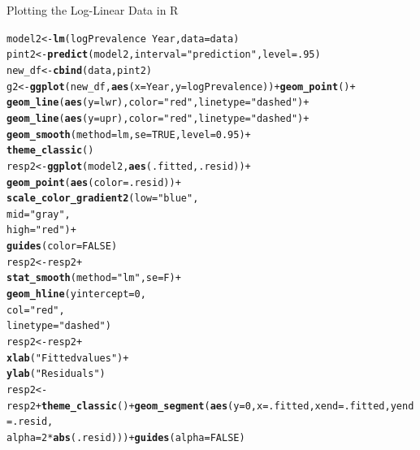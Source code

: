\documentclass[english]{article}\usepackage[]{graphicx}\usepackage[]{color}
\makeatletter
\newcommand{\hlnum}[1]{\textcolor[rgb]{0.686,0.059,0.569}{#1}}%
\newcommand{\hlstr}[1]{\textcolor[rgb]{0.192,0.494,0.8}{#1}}%
\newcommand{\hlopt}[1]{\textcolor[rgb]{0,0,0}{#1}}%
\newcommand{\hlstd}[1]{\textcolor[rgb]{0.345,0.345,0.345}{#1}}%
\newcommand{\hlkwb}[1]{\textcolor[rgb]{0.69,0.353,0.396}{#1}}%
\newcommand{\hlkwc}[1]{\textcolor[rgb]{0.333,0.667,0.333}{#1}}%
\newcommand{\hlkwd}[1]{\textcolor[rgb]{0.737,0.353,0.396}{\textbf{#1}}}%
\newenvironment{kframe}{%
 \def\at@end@of@kframe{}%
 \ifinner\ifhmode%
  \def\at@end@of@kframe{\end{minipage}}%
  \begin{minipage}{\columnwidth}%
 \fi\fi%
 \def\FrameCommand##1{\hskip\@totalleftmargin \hskip-\fboxsep
 \colorbox{shadecolor}{##1}\hskip-\fboxsep
     \hskip-\linewidth \hskip-\@totalleftmargin \hskip\columnwidth}%
 \MakeFramed {\advance\hsize-\width
   \@totalleftmargin\z@ \linewidth\hsize
   \@setminipage}}%
 {\par\unskip\endMakeFramed%
 \at@end@of@kframe}
\newenvironment{knitrout}{}{} %
\makeatother
\begin{document}
\begin{Code}[H]
	\caption{Plotting the Log-Linear Data in R}
\begin{knitrout}
\color{fgcolor}\begin{kframe}
\begin{alltt}
\hlstd{model2} \hlkwb{<-}\hlkwd{lm}\hlstd{(logPrevalence}\hlopt{~}\hlstd{Year,}\hlkwc{data}\hlstd{=data)}
\hlstd{pint2}\hlkwb{<-}\hlkwd{predict}\hlstd{(model2,}\hlkwc{interval}\hlstd{=}\hlstr{"prediction"}\hlstd{,}\hlkwc{level}\hlstd{=}\hlnum{.95}\hlstd{)}
\hlstd{new_df}\hlkwb{<-}\hlkwd{cbind}\hlstd{(data,pint2)}
\hlstd{g2}\hlkwb{<-}\hlkwd{ggplot}\hlstd{(new_df,} \hlkwd{aes}\hlstd{(}\hlkwc{x}\hlstd{=Year,} \hlkwc{y}\hlstd{=logPrevalence))}\hlopt{+}\hlkwd{geom_point}\hlstd{()} \hlopt{+}
\hlkwd{geom_line}\hlstd{(}\hlkwd{aes}\hlstd{(}\hlkwc{y}\hlstd{=lwr),} \hlkwc{color} \hlstd{=} \hlstr{"red"}\hlstd{,} \hlkwc{linetype} \hlstd{=} \hlstr{"dashed"}\hlstd{)}\hlopt{+}
\hlkwd{geom_line}\hlstd{(}\hlkwd{aes}\hlstd{(}\hlkwc{y}\hlstd{=upr),} \hlkwc{color} \hlstd{=} \hlstr{"red"}\hlstd{,} \hlkwc{linetype} \hlstd{=} \hlstr{"dashed"}\hlstd{)}\hlopt{+}
\hlkwd{geom_smooth}\hlstd{(}\hlkwc{method}\hlstd{=lm,} \hlkwc{se}\hlstd{=}\hlnum{TRUE}\hlstd{,}\hlkwc{level}\hlstd{=}\hlnum{0.95}\hlstd{)}\hlopt{+}
\hlkwd{theme_classic}\hlstd{()}
\hlstd{resp2}\hlkwb{<-}\hlkwd{ggplot}\hlstd{(model2,} \hlkwd{aes}\hlstd{(.fitted, .resid))}\hlopt{+}
\hlkwd{geom_point}\hlstd{(}\hlkwd{aes}\hlstd{(}\hlkwc{color} \hlstd{= .resid))} \hlopt{+}
\hlkwd{scale_color_gradient2}\hlstd{(}\hlkwc{low} \hlstd{=} \hlstr{"blue"}\hlstd{,}
\hlkwc{mid} \hlstd{=} \hlstr{"gray"}\hlstd{,}
\hlkwc{high} \hlstd{=} \hlstr{"red"}\hlstd{)} \hlopt{+}
\hlkwd{guides}\hlstd{(}\hlkwc{color} \hlstd{=} \hlnum{FALSE}\hlstd{)}
\hlstd{resp2}\hlkwb{<-}\hlstd{resp2}\hlopt{+}
\hlkwd{stat_smooth}\hlstd{(}\hlkwc{method}\hlstd{=}\hlstr{"lm"}\hlstd{,}\hlkwc{se}\hlstd{=F)}\hlopt{+}
\hlkwd{geom_hline}\hlstd{(}\hlkwc{yintercept}\hlstd{=}\hlnum{0}\hlstd{,}
\hlkwc{col}\hlstd{=}\hlstr{"red"}\hlstd{,}
\hlkwc{linetype}\hlstd{=}\hlstr{"dashed"}\hlstd{)}
\hlstd{resp2}\hlkwb{<-}\hlstd{resp2}\hlopt{+}
\hlkwd{xlab}\hlstd{(}\hlstr{"Fitted values"}\hlstd{)}\hlopt{+}
\hlkwd{ylab}\hlstd{(}\hlstr{"Residuals"}\hlstd{)}
\hlstd{resp2}\hlkwb{<-}\hlstd{resp2}\hlopt{+}\hlkwd{theme_classic}\hlstd{()}\hlopt{+}\hlkwd{geom_segment}\hlstd{(}\hlkwd{aes}\hlstd{(}\hlkwc{y}\hlstd{=}\hlnum{0}\hlstd{,}\hlkwc{x}\hlstd{=.fitted,}\hlkwc{xend}\hlstd{=.fitted,} \hlkwc{yend}\hlstd{=.resid,}
\hlkwc{alpha} \hlstd{=} \hlnum{2}\hlopt{*}\hlkwd{abs}\hlstd{(.resid)))}\hlopt{+}\hlkwd{guides}\hlstd{(}\hlkwc{alpha}\hlstd{=}\hlnum{FALSE}\hlstd{)}

\end{alltt}
\end{kframe}
\end{knitrout}
\end{Code}
\end{document}
